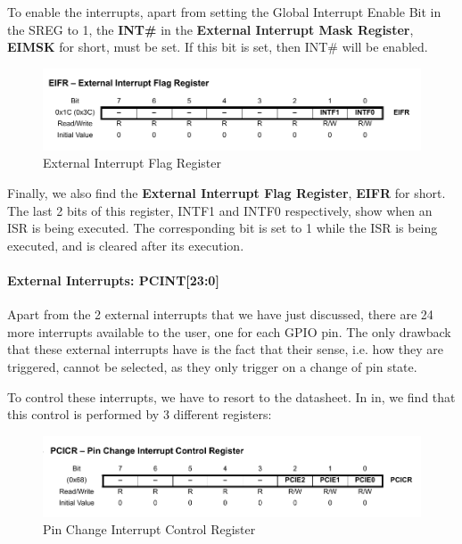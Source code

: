 To enable the interrupts, apart from setting the Global Interrupt Enable Bit in the SREG to 1, the \textbf{INT\#} in the \textbf{External Interrupt Mask Register}, \textbf{EIMSK} for short, must be set. If this bit is set, then INT\# will be enabled.\medskip


\begin{figure}[H]
    \centering
    \includegraphics[width = \textwidth]{Graphics/MICROS/Practice 3/DATASHEET/EIFR.pdf}
    \caption{External Interrupt Flag Register~\autocite{ATMEGA328P}}
    \label{fig:EIFR}
\end{figure}

Finally, we also find the \textbf{External Interrupt Flag Register}, \textbf{EIFR} for short. The last 2 bits of this register, INTF1 and INTF0 respectively, show when an ISR is being executed. The corresponding bit is set to 1 while the ISR is being executed, and is cleared after its execution.\medskip


\paragraph{External Interrupts: PCINT[23:0]}

Apart from the 2 external interrupts that we have just discussed, there are 24 more interrupts available to the user, one for each GPIO pin. The only drawback that these external interrupts have is the fact that their sense, i.e. how they are triggered, cannot be selected, as they only trigger on a change of pin state.\medskip

To control these interrupts, we have to resort to the datasheet. In in, we find that this control is performed by 3 different registers:

\begin{figure}[H]
    \centering
    \includegraphics[width = \textwidth]{Graphics/MICROS/Practice 3/DATASHEET/PCICR.pdf}
    \caption{Pin Change Interrupt Control Register~\autocite{ATMEGA328P}}
    \label{fig:PCICR}
\end{figure}

